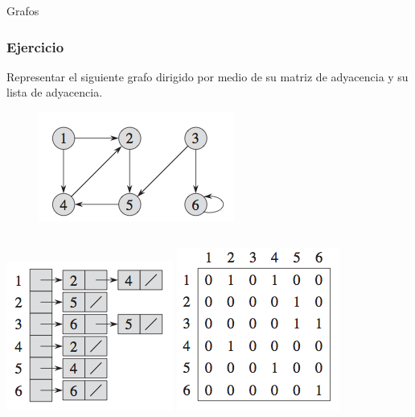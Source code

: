 \documentclass{beamer}
\begin{document}
\begin{section}{Grafos}
	\begin{frame}
		\frametitle{Ejercicio}
		Representar el siguiente grafo dirigido por medio de su matriz de adyacencia y su lista de adyacencia.
		\begin{figure}
			\includegraphics[height = 0.3\textheight]{ejemplo_digraph.png}
		\end{figure}
		\pause
		\begin{columns}
				\includegraphics[height = 0.3\textheight]{lista_digraph.png}
				\includegraphics[height = 0.3\textheight]{matriz_digraph.png}
		\end{columns}		
	\end{frame}
	

\end{section}
\end{document}
